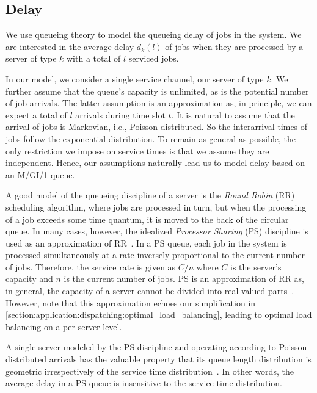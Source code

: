 \subsection{Delay}

We use queueing theory to model the queueing delay of jobs in the system. We are interested in the average delay $d_{k}(l)$ of jobs when they are processed by a server of type $k$ with a total of $l$ serviced jobs.

In our model, we consider a single service channel, our server of type $k$. We further assume that the queue's capacity is unlimited, as is the potential number of job arrivals. The latter assumption is an approximation as, in principle, we can expect a total of $l$ arrivals during time slot $t$. It is natural to assume that the arrival of jobs is Markovian, i.e., Poisson-distributed. So the interarrival times of jobs follow the exponential distribution. To remain as general as possible, the only restriction we impose on service times is that we assume they are independent. Hence, our assumptions naturally lead us to model delay based on an M/GI/1 queue.

A good model of the queueing discipline of a server is the \emph{Round Robin} (RR) scheduling algorithm, where jobs are processed in turn, but when the processing of a job exceeds some time quantum, it is moved to the back of the circular queue. In many cases, however, the idealized \emph{Processor Sharing} (PS) discipline is used as an approximation of RR~\cite{Lin2011, Lin2012}. In a PS queue, each job in the system is processed simultaneously at a rate inversely proportional to the current number of jobs. Therefore, the service rate is given as $C / n$ where $C$ is the server's capacity and $n$ is the current number of jobs. PS is an approximation of RR as, in general, the capacity of a server cannot be divided into real-valued parts~\cite{Virtamo2007}. However, note that this approximation echoes our simplification in \cref{section:application:dispatching:optimal_load_balancing}, leading to optimal load balancing on a per-server level.

A single server modeled by the PS discipline and operating according to Poisson-distributed arrivals has the valuable property that its queue length distribution is geometric irrespectively of the service time distribution~\cite{Aalto2007}. In other words, the average delay in a PS queue is insensitive to the service time distribution.

